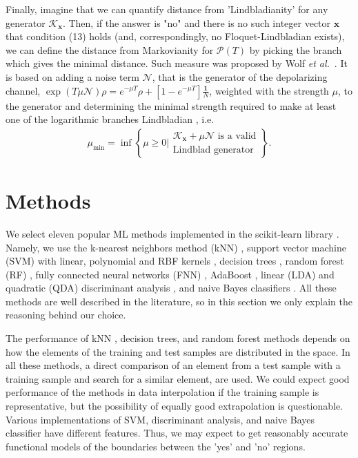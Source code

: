 \documentclass[%
 aip,
 floatfix,
 amsmath,amssymb,
 reprint,%
]{revtex4-1}
\begin{document}
Finally, imagine that we can quantify distance from 'Lindbladianity' for any  generator $\mathcal{K}_{\mathbf{x}}$. Then, if the answer is "no" and  there is no such integer vector ${\mathbf{x}}$ that condition (13) holds (and, correspondingly, no Floquet-Lindbladian exists), we can define the distance from Markovianity for $\mathcal{P}(T)$  by picking the branch which gives the minimal distance. Such measure was proposed by Wolf \emph{et al.}~\cite{X1}. It is based on adding a noise term $\mathcal{N}$, that is the generator of the depolarizing channel, 
$\exp(T\mu \mathcal{N})\rho = e^{-\mu T} \rho + [1 - e^{-\mu T}] \frac{\mathbf{1}}{N}$, weighted with the strength $\mu$, to 
the generator and determining the minimal strength required to make at least one of the logarithmic branches Lindbladian , i.e.
\begin{align}
\mu_{\mathrm{min}}=\inf \left\lbrace \mu \geq 0 {\Big\vert} \begin{array}{l}   \mathcal{K}_{\mathbf{x}} + \mu \mathcal{N}  \text{ is a valid} \\
\text{Lindblad generator}\end{array} \right\rbrace.
\end{align}


\section{Methods\label{sec:3}}

We select eleven popular ML methods implemented in the scikit-learn library \cite{scikit-learn}. Namely, we use the k-nearest neighbors method (kNN) \cite{X5,X6}, support vector machine (SVM) with linear, polynomial and RBF kernels \cite{X7,X9}, decision trees \cite{X10,X11}, random forest (RF) \cite{X12,X13}, fully connected neural networks (FNN) \cite{X14,X15}, AdaBoost \cite{X17}, linear (LDA) and quadratic (QDA) discriminant analysis \cite{X18}, and naive Bayes classifiers \cite{X19}. All these methods are well described in the literature, so in this section we only explain the reasoning behind our choice. 


The performance of   kNN , decision trees, and random forest methods
depends on how the elements of the training and test samples are distributed in the space. In all these methods, a direct comparison of an element from a test sample with a training sample and search for a similar element, are used. We could expect  good performance of the methods in data interpolation if the training sample is representative, but the possibility of  equally good extrapolation is questionable. Various implementations of SVM, discriminant analysis, and naive Bayes classifier have different features. Thus, we may expect to get reasonably accurate functional models of the boundaries between the 'yes' and 'no' regions. 
\end{document}
